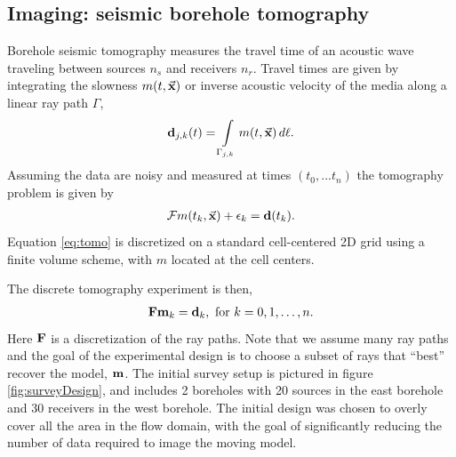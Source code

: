 \documentclass[final,leqno,onefignum,onetabnum]{siamltexmm}
\begin{document}
\subsection{Imaging: seismic borehole tomography}
 Borehole seismic tomography  measures the travel time of an acoustic wave traveling between sources $n_s$ and receivers $n_r$. Travel times are given by integrating the slowness  $m(t,\vec {\bf x})$  or inverse acoustic velocity of the media  along a linear ray path $\Gamma$,
\begin{align}\label{eq:tomo}
\bfd_{j,k}(t) =  \int\limits_{\Gamma_{j,k}} m(t,\vx)\, d\ell.
\end{align}
%
Assuming the data are noisy and measured at times $(t_0,...t_n)$ the tomography problem is given by 
\begin{align}
\mathcal{F} m(t_{k},\vec {\bf x}) + \epsilon_{k}  = {\bf{d}}(t_{k}).\\
\end{align}
%
Equation \eqref{eq:tomo} is discretized on a standard cell-centered 2D grid using a finite volume scheme, with  $m$ located at the cell centers.

The discrete tomography experiment is then,
%
\begin{align}
 	{\bf{F}}{{\bf{m}}_k} = {\bf{d}}_k, \text{ for } k=0,1,\ldots,n.
\end{align}
%
Here ${\bf{F}}$ is a discretization of the ray paths. Note that we assume many ray paths and the goal of the experimental design is to choose a subset of rays that ``best'' recover the model, ${\bf{m}}$.
The initial survey setup is pictured in figure \ref{fig:surveyDesign}, and includes 2 boreholes with 20 sources in the east borehole and  30 receivers in the west borehole. The initial design was chosen to overly cover all the area in the flow domain, with the goal of significantly reducing the number of data required to image the moving model. 
%
\end{document}
